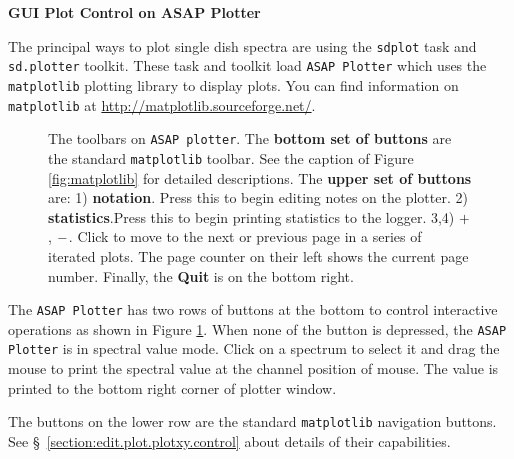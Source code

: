 


\bigskip
{\bf GUI Plot Control on ASAP Plotter}

The principal ways to plot single dish spectra are using 
the {\tt sdplot} task and {\tt sd.plotter} toolkit. 
These task and toolkit load {\tt ASAP Plotter} which uses 
the {\tt matplotlib} plotting library to display plots. 
You can find information on {\tt matplotlib} at
\url{http://matplotlib.sourceforge.net/}.

\begin{figure}[h!]
\begin{center}
\caption{\label{fig:sdplot_toolbar}
  The toolbars on {\tt ASAP plotter}.
  The {\bf bottom set of buttons} are the standard {\tt matplotlib} toolbar. 
  See the caption of Figure \ref{fig:matplotlib} for detailed descriptions.
  The {\bf upper set of buttons} are:
  1) {\bf notation}. Press this to begin editing notes on the plotter. 
  2) {\bf statistics}.Press this to begin printing statistics to the logger.
  3,4) $ {\bf +} $, $ {\bf -} $. Click to move to the next or previous page in a series 
  of iterated plots. The page counter on their left shows the current page 
  number. Finally, the {\bf Quit} is on the bottom right.}
\hrulefill
\end{center}
\end{figure}

The {\tt ASAP Plotter} has two rows of buttons at the bottom to 
control interactive operations as shown in Figure \ref{fig:sdplot_toolbar}. 
When none of the button is depressed, the {\tt ASAP Plotter} is in spectral 
value mode. Click on a spectrum to select it and drag the mouse to print 
the spectral value at the channel position of mouse. The value is printed 
to the bottom right corner of plotter window.

The buttons on the lower row are the standard 
{\tt matplotlib} navigation buttons. 
See \S~\ref{section:edit.plot.plotxy.control} about details of their 
capabilities.

